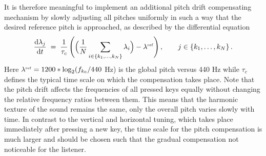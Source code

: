 It is therefore meaningful to implement an additional pitch drift compensating mechanism by slowly adjusting all pitches uniformly in such a way that the desired reference pitch is approached, as described by the differential equation
%
\begin{equation}
\frac{{\rm d} \lambda_j}{{\rm d} t} \;=\; \frac{1}{\tau_c} \,
\Biggl(\Bigl(\frac{1}{N}\sum_{i\in\{k_1,\ldots,k_N\}} \lambda_i\Bigr)-\lambda^{\rm\scriptscriptstyle ref} \Biggr)\,,\qquad {j \in\{k_1,\ldots,k_N\}\,.
}\end{equation}
% 
Here $\lambda^{\rm\scriptscriptstyle ref}=1200*\log_2(f_{k_0}/440$ Hz) is the global pitch versus 440 Hz while $\tau_c$ defines the typical time scale on which the compensation takes place.  Note that the pitch drift affects the frequencies of all pressed keys equally without changing the relative frequency ratios between them. This means that the harmonic texture of the sound remains the same, only the overall pitch varies slowly with time. In contrast to the vertical and horizontal tuning, which takes place immediately after pressing a new key, the time scale for the pitch compensation is much larger and should be chosen such that the gradual compensation not noticeable for the listener.
